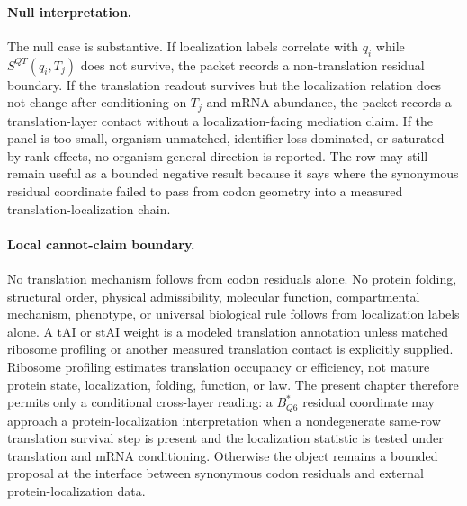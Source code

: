 \paragraph{Null interpretation.}
The null case is substantive. If localization labels correlate with $q_i$ while $S^{QT}(q_i,T_j)$ does not survive, the packet records a non-translation residual boundary. If the translation readout survives but the localization relation does not change after conditioning on $T_j$ and mRNA abundance, the packet records a translation-layer contact without a localization-facing mediation claim. If the panel is too small, organism-unmatched, identifier-loss dominated, or saturated by rank effects, no organism-general direction is reported. The row may still remain useful as a bounded negative result because it says where the synonymous residual coordinate failed to pass from codon geometry into a measured translation-localization chain.

\paragraph{Local cannot-claim boundary.}
No translation mechanism follows from codon residuals alone. No protein folding, structural order, physical admissibility, molecular function, compartmental mechanism, phenotype, or universal biological rule follows from localization labels alone. A tAI or stAI weight is a modeled translation annotation unless matched ribosome profiling or another measured translation contact is explicitly supplied. Ribosome profiling estimates translation occupancy or efficiency, not mature protein state, localization, folding, function, or law. The present chapter therefore permits only a conditional cross-layer reading: a $B^*_{Q6}$ residual coordinate may approach a protein-localization interpretation when a nondegenerate same-row translation survival step is present and the localization statistic is tested under translation and mRNA conditioning. Otherwise the object remains a bounded proposal at the interface between synonymous codon residuals and external protein-localization data.

